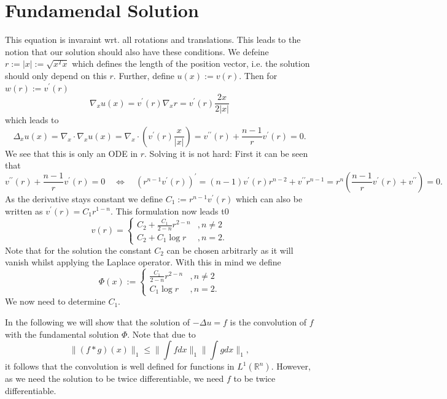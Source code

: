 \documentclass[A4,12pt,twoside]{book}
\begin{document}
\section{Fundamendal Solution}
This equation is invaraint wrt. all rotations and translations. This leads to the notion that our solution should also have these conditions. We defeine $r:= |x| := \sqrt{x^T x}$ which defines the length of the position vector, i.e. the solution should only depend on this $r$. Further, define $u(x) := v(r) $. Then for $w(r) := v^\prime (r)$
\[
\nabla_x u(x) = v^\prime (r)  \nabla_x r = v^\prime(r) \frac{2x}{2|x|}
\]
which leads to
\[
\Delta_x u(x) = \nabla_x \cdot \nabla_x u(x)= \nabla_x \cdot (v^\prime(r) \frac{x}{|x|} )= v^{\prime \prime} (r) + \frac{n-1}{r} v^\prime (r)=0.
\]
We see that this is only an ODE in $r$. Solving it is not hard: First it can be seen that
\[
v^{\prime \prime} (r) + \frac{n-1}{r} v^\prime (r) =0 \quad \iff \quad (r^{n-1} v^\prime (r) )^\prime= (n-1) v^\prime (r) r^{n-2} + v^{\prime \prime} r^{n-1} = r^n ( \frac{n-1}{r} v^\prime (r) + v^{\prime \prime}  ) =0.
\]
As the derivative stays constant we define $C_1 := r^{n-1} v^\prime (r)$ which can also be written as $v^\prime (r) =C_1 r^{1-n}$. This formulation now leads t0
\[
v(r) = \begin{cases}
    C_2 + \frac{C_1}{2-n} r^{2-n} &, n \neq 2\\
    C_2 + C_1 \log r &, n=2.
\end{cases}
\]
Note that for the solution the constant $C_2$ can be chosen arbitrarly as it will vanish whilst applying the Laplace operator. With this in mind we define
\[
\Phi (x) := \begin{cases}
    \frac{C_1}{2-n} r^{2-n} &, n \neq 2\\
    C_1 \log r &, n=2.
\end{cases}
\] 
We now need to determine $C_1$.

In the following we will show that the solution of $-\Delta u =f$ is the convolution of $f$ with the fundamental solution $\Phi$. Note that due to 
\[
\| (f*g)(x) \|_1 \leq  \|\int f dx \|_1 \| \int g dx\|_1 ,
\]
it follows that the convolution is well defined for functions in $L^1(\mathbb{R}^n)$. However, as we need the solution to be twice differentiable, we need $f$ to be twice differentiable.
\end{document}
